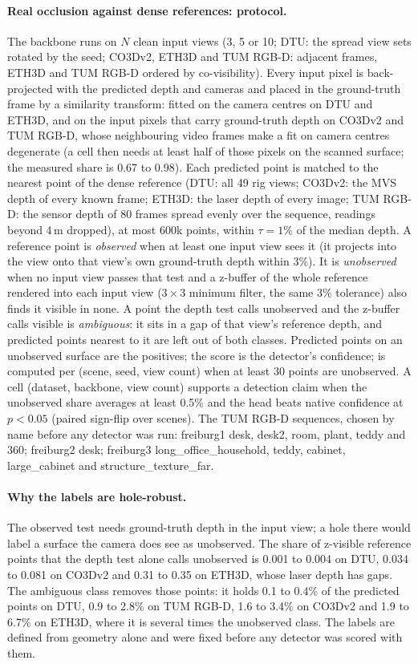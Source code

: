 \paragraph{Real occlusion against dense references: protocol.}
The backbone runs on $N$ clean input views (3, 5 or 10; DTU: the spread view sets rotated by the seed; CO3Dv2, ETH3D and TUM RGB-D: adjacent frames, ETH3D and TUM RGB-D ordered by co-visibility). Every input pixel is back-projected with the predicted depth and cameras and placed in the ground-truth frame by a similarity transform: fitted on the camera centres on DTU and ETH3D, and on the input pixels that carry ground-truth depth on CO3Dv2 and TUM RGB-D, whose neighbouring video frames make a fit on camera centres degenerate (a cell then needs at least half of those pixels on the scanned surface; the measured share is 0.67 to 0.98). Each predicted point is matched to the nearest point of the dense reference (DTU: all 49 rig views; CO3Dv2: the MVS depth of every known frame; ETH3D: the laser depth of every image; TUM RGB-D: the sensor depth of 80 frames spread evenly over the sequence, readings beyond 4\,m dropped), at most 600k points, within $\tau = 1\%$ of the median depth. A reference point is \emph{observed} when at least one input view sees it (it projects into the view onto that view's own ground-truth depth within 3\%). It is \emph{unobserved} when no input view passes that test and a z-buffer of the whole reference rendered into each input view ($3\times3$ minimum filter, the same 3\% tolerance) also finds it visible in none. A point the depth test calls unobserved and the z-buffer calls visible is \emph{ambiguous}: it sits in a gap of that view's reference depth, and predicted points nearest to it are left out of both classes. Predicted points on an unobserved surface are the positives; the score is the detector's confidence; \auroc{} is computed per (scene, seed, view count) when at least 30 points are unobserved. A cell (dataset, backbone, view count) supports a detection claim when the unobserved share averages at least 0.5\% and the head beats native confidence at $p<0.05$ (paired sign-flip over scenes). The TUM RGB-D sequences, chosen by name before any detector was run: freiburg1 desk, desk2, room, plant, teddy and 360; freiburg2 desk; freiburg3 long\_office\_household, teddy, cabinet, large\_cabinet and structure\_texture\_far.

\paragraph{Why the labels are hole-robust.}
The observed test needs ground-truth depth in the input view; a hole there would label a surface the camera does see as unobserved. The share of z-visible reference points that the depth test alone calls unobserved is 0.001 to 0.004 on DTU, 0.034 to 0.081 on CO3Dv2 and 0.31 to 0.35 on ETH3D, whose laser depth has gaps. The ambiguous class removes those points: it holds 0.1 to 0.4\% of the predicted points on DTU, 0.9 to 2.8\% on TUM RGB-D, 1.6 to 3.4\% on CO3Dv2 and 1.9 to 6.7\% on ETH3D, where it is several times the unobserved class. The labels are defined from geometry alone and were fixed before any detector was scored with them.

